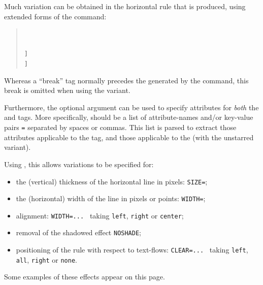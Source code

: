 %
%
%
\begin{changebar}
Much variation can be obtained in the horizontal rule that is produced,
using extended forms of the  command:
\begin{quote}
\begin{small}
\\
\\
\Lc{htmlrule[}\texttt{]}\\
\Lc{htmlrule*[}\texttt{]}
\end{small}
\end{quote}
Whereas a ``break'' tag  normally precedes the  generated
by the  command, 
this break is omitted when using the  variant. 

\htmlrule[center,width=200]

\noindent
Furthermore, the optional argument  can be used to specify 
attributes for \emph{both} the  and  tags. 
More specifically,  should be a list of attribute-names 
and/or key-value pairs \texttt{=} separated by spaces or commas. 
This list is parsed to extract those attributes applicable to the  tag,
and those applicable to the  (with the unstarred variant).

\medskip\htmlrule[right,width=200,size=5]
\noindent
Using \HTMLiii, this allows variations to be specified for:
\begin{itemize}
\item 
the (vertical) thickness of the horizontal line in pixels: \texttt{SIZE=};
\item 
the (horizontal) width of the line in pixels or points: \texttt{WIDTH=};
\item 
alignment: \texttt{WIDTH=... } 
taking \texttt{left}, \texttt{right} or \texttt{center};
\item 
removal of the shadowed effect \texttt{NOSHADE};
\item 
positioning of the rule with respect to text-flows: 
\texttt{CLEAR=... } 
taking \texttt{left}, \texttt{all}, \texttt{right} or \texttt{none}. 
\htmlrule[right,width=200,size=5]
\end{itemize}%
Some examples of these effects appear on 
 this page.%
\end{changebar}%


